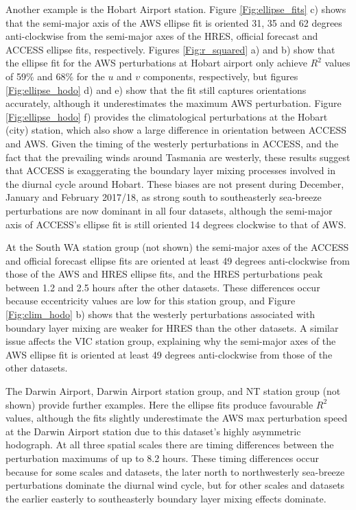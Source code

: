 \documentclass[twocol]{ametsoc}
\begin{document}
Another example is the Hobart Airport station. Figure \ref{Fig:ellipse_fits} c) shows that the semi-major axis of the AWS ellipse fit is oriented 31, 35 and 62 degrees anti-clockwise from the semi-major axes of the HRES, official forecast and ACCESS ellipse fits, respectively. Figures \ref{Fig:r_squared} a) and b) show that the ellipse fit for the AWS perturbations at Hobart airport only achieve $R^2$ values of 59\% and 68\% for the $u$ and $v$ components, respectively, but figures \ref{Fig:ellipse_hodo} d) and e) show that the fit still captures orientations accurately, although it underestimates the maximum AWS perturbation. Figure \ref{Fig:ellipse_hodo} f) provides the climatological perturbations at the Hobart (city) station, which also show a large difference in orientation between ACCESS and AWS. Given the timing of the westerly perturbations in ACCESS, and the fact that the prevailing winds around Tasmania are westerly, these results suggest that ACCESS is exaggerating the boundary layer mixing processes involved in the diurnal cycle around Hobart. These biases are not present during December, January and February 2017/18, as strong south to southeasterly sea-breeze perturbations are now dominant in all four datasets, although the semi-major axis of ACCESS's ellipse fit is still oriented 14 degrees clockwise to that of AWS. 

At the South WA station group (not shown) the semi-major axes of the ACCESS and official forecast ellipse fits are oriented at least 49 degrees anti-clockwise from those of the AWS and HRES ellipse fits, and the HRES perturbations peak between 1.2 and 2.5 hours after the other datasets. These differences occur because eccentricity values are low for this station group, and Figure \ref{Fig:clim_hodo} b) shows that the westerly perturbations associated with boundary layer mixing are weaker for HRES than the other datasets. A similar issue affects the VIC station group, explaining why the semi-major axes of the AWS ellipse fit is oriented at least 49 degrees anti-clockwise from those of the other datasets. 

The Darwin Airport, Darwin Airport station group, and NT station group (not shown) provide further examples. Here the ellipse fits produce favourable $R^2$ values, although the fits slightly underestimate the AWS max perturbation speed at the Darwin Airport station due to this dataset's highly asymmetric hodograph. At all three spatial scales there are timing differences between the perturbation maximums of up to 8.2 hours. These timing differences occur because for some scales and datasets, the later north to northwesterly sea-breeze perturbations dominate the diurnal wind cycle, but for other scales and datasets the earlier easterly to southeasterly boundary layer mixing effects dominate.
\end{document}
